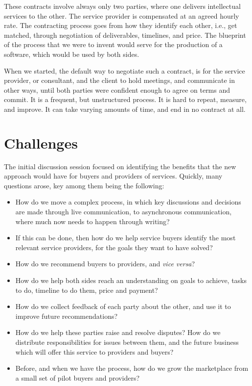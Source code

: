 \documentclass[graybox,envcountchap,sectrefs]{svmono}
\begin{document}
These contracts involve always only two parties, where one delivers intellectual services to the other. The service provider is compensated at an agreed hourly rate. The contracting process goes from how they identify each other, i.e., get matched, through negotiation of deliverables, timelines, and price. The blueprint of the process that we were to invent would serve for the production of a software, which would be used by both sides.

When we started, the default way to negotiate such a contract, is for the service provider, or consultant, and the client to hold meetings, and communicate in other ways, until both parties were confident enough to agree on terms and commit. It is a frequent, but unstructured process. It is hard to repeat, measure, and improve. It can take varying amounts of time, and end in no contract at all.

\section{Challenges}
The initial discussion session focused on identifying the benefits that the new approach would have for buyers and providers of services. Quickly, many questions arose, key among them being the following:
\begin{itemize}
	\item How do we move a complex process, in which key discussions and decisions are made through live communication, to asynchronous communication, where much now needs to happen through writing? 
	\item If this can be done, then how do we help service buyers identify the most relevant service providers, for the goals they want to have solved? 
	\item How do we recommend buyers to providers, and \textit{vice versa}? 
	\item How do we help both sides reach an understanding on goals to achieve, tasks to do, timeline to do them, price and payment?
	\item How do we collect feedback of each party about the other, and use it to improve future recommendations?
	\item How do we help these parties raise and resolve disputes? How do we distribute responsibilities for issues between them, and the future business which will offer this service to providers and buyers?
	\item Before, and when we have the process, how do we grow the marketplace from a small set of pilot buyers and providers? 
\end{itemize}
\end{document}
